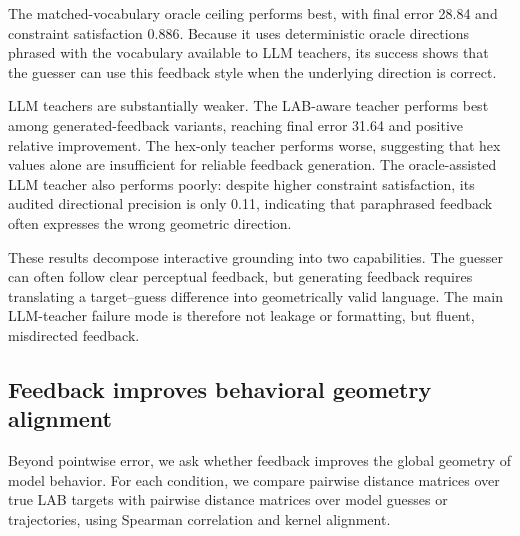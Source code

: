 \documentclass[11pt]{article}
\begin{document}
The matched-vocabulary oracle ceiling performs best, with final error 28.84
and constraint satisfaction 0.886. Because it uses deterministic oracle
directions phrased with the vocabulary available to LLM teachers, its success
shows that the guesser can use this feedback style when the underlying
direction is correct.

LLM teachers are substantially weaker. The LAB-aware teacher performs best
among generated-feedback variants, reaching final error 31.64 and positive
relative improvement. The hex-only teacher performs worse, suggesting that
hex values alone are insufficient for reliable feedback generation. The
oracle-assisted LLM teacher also performs poorly: despite higher constraint
satisfaction, its audited directional precision is only 0.11, indicating
that paraphrased feedback often expresses the wrong geometric direction.

These results decompose interactive grounding into two capabilities. The
guesser can often follow clear perceptual feedback, but generating feedback
requires translating a target--guess difference into geometrically valid
language. The main LLM-teacher failure mode is therefore not leakage or
formatting, but fluent, misdirected feedback.

\subsection{Feedback improves behavioral geometry alignment}
\label{sec:results_geometry}

Beyond pointwise error, we ask whether feedback improves the global geometry
of model behavior. For each condition, we compare pairwise distance matrices
over true LAB targets with pairwise distance matrices over model guesses or
trajectories, using Spearman correlation and kernel alignment.

\begin{table}[t]
\centering
\small
{}
\caption{Behavioral geometry alignment on \texttt{main\_12000}. Feedback
makes the geometry of model guesses and trajectories more aligned with true
LAB geometry.}
\label{tab:geometry}
\end{table}
\end{document}
